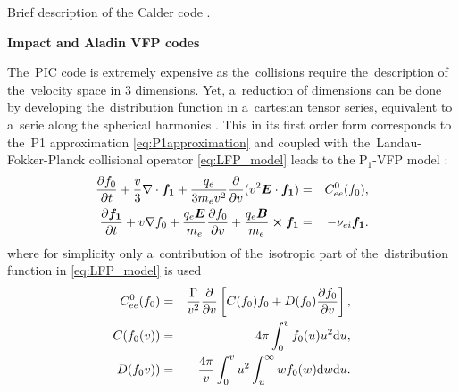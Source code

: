 Brief description of the Calder code .

\textbf{Impact and Aladin VFP codes}

The~PIC code is extremely expensive as the~collisions require the~description 
of the~velocity space in 3 dimensions. Yet, a~reduction of dimensions can be 
done by developing the~distribution function in a~cartesian tensor series, 
equivalent to a~serie along the spherical harmonics \cite{Johnston_PR1960}.
This in its first order form corresponds to the~P1 approximation 
\eqref{eq:P1approximation} and coupled with
the~Landau-Fokker-Planck collisional operator 
\eqref{eq:LFP_model} leads to the P$_1$-VFP model 
\cite{Johnston_PR1960, Kingham_JCP2004}:
\begin{eqnarray}
\frac{\partial f_0}{\partial t}+\frac{v}{3}\nabla \cdot {\boldsymbol{f_1}}
+\frac{q_e}{3m_ev^2}\frac{\partial}{\partial v}(v^2\boldsymbol{E}\cdot {\boldsymbol{f_1}})
&=&
C^0_{ee}(f_0) ,
 \label{eq:P1f0_Aladin}\\
\frac{\partial {\boldsymbol{f_1}}}{\partial t}+v\nabla f_0
+ \frac{q_e\boldsymbol{E}}{m_e}\frac{\partial f_0}{\partial v}
+\frac{q_e\boldsymbol{B}}{m_e}\boldsymbol{\times} {\boldsymbol{f_1}} 
&=&
- \nu_{ei}{\boldsymbol{f_1}} .
\label{eq:P1f1_Aladin}
\end{eqnarray}
where for simplicity only a~contribution of the~isotropic part of 
the~distribution function in \eqref{eq:LFP_model} is used 
\begin{eqnarray} 
C^0_{ee}(f_0) &=& \frac{\Gamma}{v^2}\frac{\partial}{\partial v}
\left[C(f_0)f_0+D(f_0)\frac{\partial f_0}{\partial v}\right] ,
\\
C(f_0(v)) &=& 4\pi\int_0^v f_0(u) u^2 \text{d} u ,
\\
D(f_0v)) &=& \frac{4\pi}{v}\int_0^v u^2\int_u^\infty w f_0(w) 
\text{d} w \text{d} u .
\end{eqnarray}

